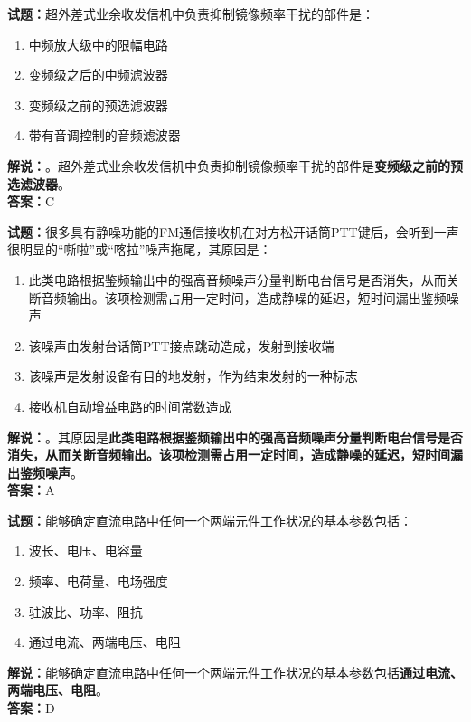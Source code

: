 \documentclass{ctexbook}
\begin{document}
\bigskip


\noindent\textbf{试题：}超外差式业余收发信机中负责抑制镜像频率干扰的部件是：
\begin{enumerate}[leftmargin=3em]
\item 中频放大级中的限幅电路
\item 变频级之后的中频滤波器
\item 变频级之前的预选滤波器
\item 带有音调控制的音频滤波器
\end{enumerate}
\noindent\textbf{解说：}。超外差式业余收发信机中负责抑制镜像频率干扰的部件是\textbf{变频级之前的预选滤波器}。\\\noindent\textbf{答案：}C



\bigskip


\noindent\textbf{试题：}很多具有静噪功能的FM通信接收机在对方松开话筒PTT键后，会听到一声很明显的“嘶啦”或“喀拉”噪声拖尾，其原因是：
\begin{enumerate}[leftmargin=3em]
\item 此类电路根据鉴频输出中的强高音频噪声分量判断电台信号是否消失，从而关断音频输出。该项检测需占用一定时间，造成静噪的延迟，短时间漏出鉴频噪声
\item 该噪声由发射台话筒PTT接点跳动造成，发射到接收端
\item 该噪声是发射设备有目的地发射，作为结束发射的一种标志
\item 接收机自动增益电路的时间常数造成
\end{enumerate}
\noindent\textbf{解说：}。其原因是\textbf{此类电路根据鉴频输出中的强高音频噪声分量判断电台信号是否消失，从而关断音频输出。该项检测需占用一定时间，造成静噪的延迟，短时间漏出鉴频噪声}。\\\noindent\textbf{答案：}A



\bigskip


\noindent\textbf{试题：}能够确定直流电路中任何一个两端元件工作状况的基本参数包括：
\begin{enumerate}[leftmargin=3em]
\item 波长、电压、电容量
\item 频率、电荷量、电场强度
\item 驻波比、功率、阻抗
\item 通过电流、两端电压、电阻
\end{enumerate}
\noindent\textbf{解说：}能够确定直流电路中任何一个两端元件工作状况的基本参数包括\textbf{通过电流、两端电压、电阻}。\\\noindent\textbf{答案：}D
\end{document}
